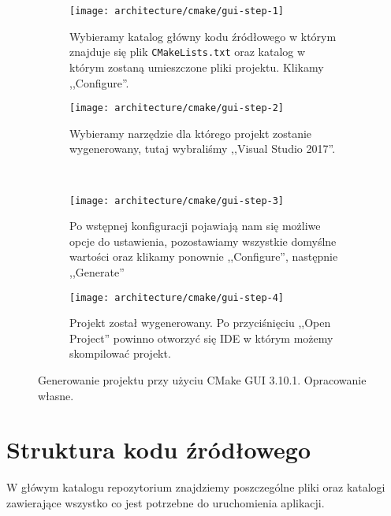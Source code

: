 \documentclass[../main.tex]{subfiles}
\begin{document}
\begin{figure}
    \centering
    
    \begin{subfigure}[t]{0.40\textwidth}
        \texttt{[image: architecture/cmake/gui-step-1]}
        \caption{Wybieramy katalog główny kodu źródłowego w którym znajduje się plik \texttt{CMakeLists.txt} oraz katalog w którym zostaną umieszczone pliki projektu. Klikamy ,,Configure''.}
    \end{subfigure}
    \hspace{0.5cm}
    \begin{subfigure}[t]{0.40\textwidth}
        \centering
        \texttt{[image: architecture/cmake/gui-step-2]}
        \caption{Wybieramy narzędzie dla którego projekt zostanie wygenerowany, tutaj wybraliśmy ,,Visual Studio 2017''.}
    \end{subfigure}

    \hfill \\ 
    \vspace{0.5cm}

    \begin{subfigure}[t]{0.40\textwidth}
        \centering
        \texttt{[image: architecture/cmake/gui-step-3]}
        \caption{Po wstępnej konfiguracji pojawiają nam się możliwe opcje do ustawienia, pozostawiamy wszystkie domyślne wartości oraz klikamy ponownie ,,Configure'', następnie ,,Generate''}
    \end{subfigure}
    \hspace{0.5cm}
    \begin{subfigure}[t]{0.40\textwidth}
        \centering
        \texttt{[image: architecture/cmake/gui-step-4]}
        \caption{Projekt został wygenerowany. Po przyciśnięciu ,,Open Project'' powinno otworzyć się IDE w którym możemy skompilować projekt.}
    \end{subfigure}
    
    \caption{Generowanie projektu przy użyciu CMake GUI 3.10.1. Opracowanie własne.}
    \label{fig:CMakeGUIUsage}
\end{figure}


\section{Struktura kodu źródłowego}

W główym katalogu repozytorium znajdziemy poszczególne pliki oraz katalogi zawierające wszystko co jest potrzebne do uruchomienia aplikacji.
\end{document}
